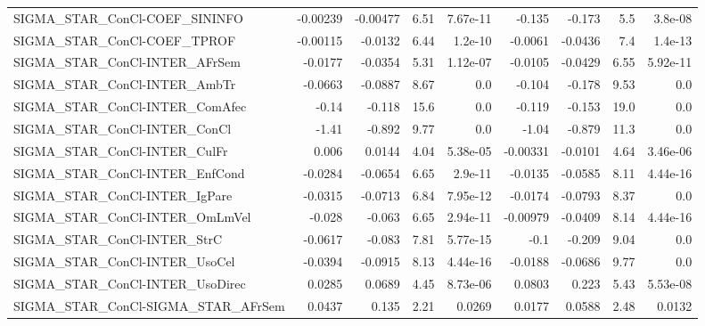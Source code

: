 \begin{tabular}{lrrrrrrrr}
SIGMA\_STAR\_ConCl-COEF\_SININFO          &    -0.00239 &     -0.00477 &     6.51 & 7.67e-11 &     -0.135 &      -0.173 &          5.5 &       3.8e-08 \\
SIGMA\_STAR\_ConCl-COEF\_TPROF            &    -0.00115 &      -0.0132 &     6.44 &  1.2e-10 &    -0.0061 &     -0.0436 &          7.4 &       1.4e-13 \\
SIGMA\_STAR\_ConCl-INTER\_AFrSem          &     -0.0177 &      -0.0354 &     5.31 & 1.12e-07 &    -0.0105 &     -0.0429 &         6.55 &      5.92e-11 \\
SIGMA\_STAR\_ConCl-INTER\_AmbTr           &     -0.0663 &      -0.0887 &     8.67 &      0.0 &     -0.104 &      -0.178 &         9.53 &           0.0 \\
SIGMA\_STAR\_ConCl-INTER\_ComAfec         &       -0.14 &       -0.118 &     15.6 &      0.0 &     -0.119 &      -0.153 &         19.0 &           0.0 \\
SIGMA\_STAR\_ConCl-INTER\_ConCl           &       -1.41 &       -0.892 &     9.77 &      0.0 &      -1.04 &      -0.879 &         11.3 &           0.0 \\
SIGMA\_STAR\_ConCl-INTER\_CulFr           &       0.006 &       0.0144 &     4.04 & 5.38e-05 &   -0.00331 &     -0.0101 &         4.64 &      3.46e-06 \\
SIGMA\_STAR\_ConCl-INTER\_EnfCond         &     -0.0284 &      -0.0654 &     6.65 &  2.9e-11 &    -0.0135 &     -0.0585 &         8.11 &      4.44e-16 \\
SIGMA\_STAR\_ConCl-INTER\_IgPare          &     -0.0315 &      -0.0713 &     6.84 & 7.95e-12 &    -0.0174 &     -0.0793 &         8.37 &           0.0 \\
SIGMA\_STAR\_ConCl-INTER\_OmLmVel         &      -0.028 &       -0.063 &     6.65 & 2.94e-11 &   -0.00979 &     -0.0409 &         8.14 &      4.44e-16 \\
SIGMA\_STAR\_ConCl-INTER\_StrC            &     -0.0617 &       -0.083 &     7.81 & 5.77e-15 &       -0.1 &      -0.209 &         9.04 &           0.0 \\
SIGMA\_STAR\_ConCl-INTER\_UsoCel          &     -0.0394 &      -0.0915 &     8.13 & 4.44e-16 &    -0.0188 &     -0.0686 &         9.77 &           0.0 \\
SIGMA\_STAR\_ConCl-INTER\_UsoDirec        &      0.0285 &       0.0689 &     4.45 & 8.73e-06 &     0.0803 &       0.223 &         5.43 &      5.53e-08 \\
SIGMA\_STAR\_ConCl-SIGMA\_STAR\_AFrSem     &      0.0437 &        0.135 &     2.21 &   0.0269 &     0.0177 &      0.0588 &         2.48 &        0.0132 \\

\end{tabular}
